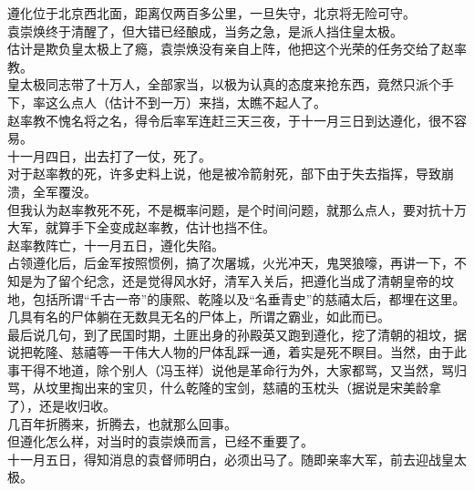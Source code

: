 \begin{multicols}{\theparacolNo}
遵化位于北京西北面，距离仅两百多公里，一旦失守，北京将无险可守。\\

袁崇焕终于清醒了，但大错已经酿成，当务之急，是派人挡住皇太极。\\

估计是欺负皇太极上了瘾，袁崇焕没有亲自上阵，他把这个光荣的任务交给了赵率教。\\

皇太极同志带了十万人，全部家当，以极为认真的态度来抢东西，竟然只派个手下，率这么点人（估计不到一万）来挡，太瞧不起人了。\\

赵率教不愧名将之名，得令后率军连赶三天三夜，于十一月三日到达遵化，很不容易。\\

十一月四日，出去打了一仗，死了。\\

对于赵率教的死，许多史料上说，他是被冷箭射死，部下由于失去指挥，导致崩溃，全军覆没。\\

但我认为赵率教死不死，不是概率问题，是个时间问题，就那么点人，要对抗十万大军，就算手下全变成赵率教，估计也挡不住。\\

赵率教阵亡，十一月五日，遵化失陷。\\

占领遵化后，后金军按照惯例，搞了次屠城，火光冲天，鬼哭狼嚎，再讲一下，不知是为了留个纪念，还是觉得风水好，清军入关后，把遵化当成了清朝皇帝的坟地，包括所谓“千古一帝”的康熙、乾隆以及“名垂青史”的慈禧太后，都埋在这里。\\

几具有名的尸体躺在无数具无名的尸体上，所谓之霸业，如此而已。\\

最后说几句，到了民国时期，土匪出身的孙殿英又跑到遵化，挖了清朝的祖坟，据说把乾隆、慈禧等一干伟大人物的尸体乱踩一通，着实是死不瞑目。当然，由于此事干得不地道，除个别人（冯玉祥）说他是革命行为外，大家都骂，又当然，骂归骂，从坟里掏出来的宝贝，什么乾隆的宝剑，慈禧的玉枕头（据说是宋美龄拿了），还是收归收。\\

几百年折腾来，折腾去，也就那么回事。\\

但遵化怎么样，对当时的袁崇焕而言，已经不重要了。\\

十一月五日，得知消息的袁督师明白，必须出马了。随即亲率大军，前去迎战皇太极。\\


\end{multicols}
